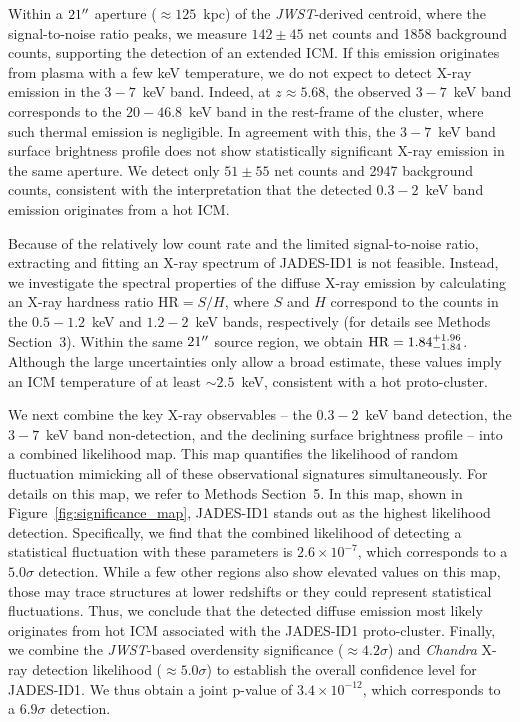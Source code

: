 \documentclass[pdflatex,sn-mathphys-num]{sn-jnl}
\newcommand{\arcsec}{\mbox{\ensuremath{^{\prime\prime}}}}
\theoremstyle{thmstyleone}
\theoremstyle{thmstyletwo}
\theoremstyle{thmstylethree}
\begin{document}
Within a $21\arcsec$ aperture ($\approx125$~kpc) of the \textit{JWST}-derived centroid, where the signal-to-noise ratio peaks, we measure $142\pm45$ net counts and 1858 background counts, supporting the detection of an extended ICM. If this emission originates from plasma with a few keV temperature, we do not expect to detect X-ray emission in the $3-7$~keV band. Indeed, at $z\approx5.68$, the observed $3-7$~keV band corresponds to the $20-46.8$~keV band in the rest-frame of the cluster, where such thermal emission is negligible. In agreement with this, the $3-7$~keV band surface brightness profile does not show statistically significant X-ray emission in the same aperture. We detect only $51\pm55$ net counts and 2947 background counts, consistent with the interpretation that the detected $0.3-2$~keV band emission originates from a hot ICM.

Because of the relatively low count rate and the limited signal-to-noise ratio, extracting and fitting an X-ray spectrum of JADES-ID1 is not feasible. Instead, we investigate the spectral properties of the diffuse X-ray emission by calculating an X-ray hardness ratio $\mathrm{HR} = S / H$, where $S$ and $H$ correspond to the counts in the  $0.5-1.2$~keV and $1.2-2$~keV bands, respectively (for details see Methods Section~3). Within the same $21\arcsec$ source region, we obtain $\rm{HR}=1.84^{+1.96}_{-1.84}$. Although the large uncertainties only allow a broad estimate, these values imply an ICM temperature of at least $\sim2.5$~keV, consistent with a hot proto-cluster.

We next combine the key X-ray observables -- the $0.3-2$~keV band detection, the $3-7$~keV band non-detection, and the declining surface brightness profile -- into a combined likelihood map. This map quantifies the likelihood of random fluctuation mimicking all of these observational signatures simultaneously. For details on this map, we refer to Methods Section~5. In this map, shown in Figure~\ref{fig:significance_map}, JADES-ID1 stands out as the highest likelihood detection. Specifically, we find that the combined likelihood of detecting a statistical fluctuation with these parameters is $2.6\times10^{-7}$, which corresponds to a $5.0\sigma$ detection. While a few other regions also show elevated values on this map, those may trace structures at lower redshifts or they could represent statistical fluctuations. Thus, we conclude that the detected diffuse emission most likely originates from hot ICM associated with the JADES-ID1 proto-cluster. Finally, we combine the \textit{JWST}-based overdensity significance ($\approx4.2\sigma$) \cite{2025MNRAS.539.1796L} and \textit{Chandra} X-ray detection likelihood ($\approx5.0\sigma$) to establish the overall confidence level for JADES-ID1. We thus obtain a joint p-value of $3.4\times10^{-12}$, which corresponds to a $6.9\sigma$ detection.
\end{document}
